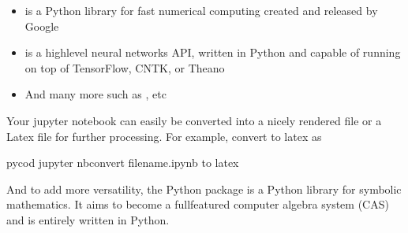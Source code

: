 \documentclass[letterpaper,10pt,english]{sphinxmanual}
\begin{document}
\begin{itemize}
\item {} 
 is a Python library for fast numerical computing created and released by Google

\item {} 
 is a high\sphinxhyphen{}level neural networks API, written in Python and capable of running on top of TensorFlow, CNTK, or Theano

\item {} 
And many more such as ,   etc

\end{itemize}

Your jupyter notebook can easily be
converted into a nicely rendered  file or a Latex file for
further processing. For example, convert to latex as

\begin{sphinxVerbatim}[commandchars=\\\{\}]
    pycod jupyter nbconvert filename.ipynb \PYGZhy{}\PYGZhy{}to latex 
\end{sphinxVerbatim}

And to add more versatility, the Python package  is a Python library for symbolic mathematics. It aims to become a full\sphinxhyphen{}featured computer algebra system (CAS)  and is entirely written in Python.
\end{document}
